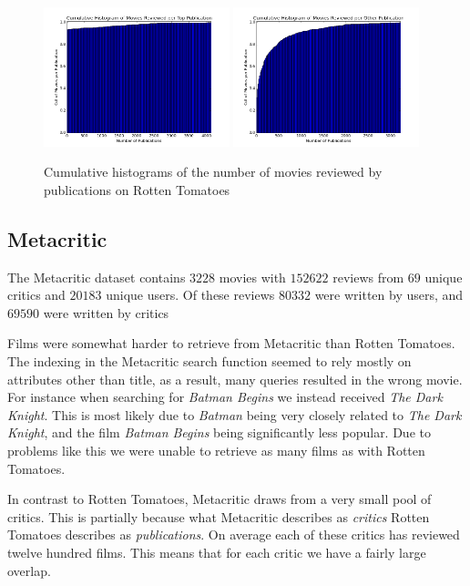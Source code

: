 \documentclass[12pt]{article}
\begin{document}
	 \begin{figure}[H]
	    \centering
	    \includegraphics[width=0.48\textwidth]{plots/plot_r_pub_top.png}
	    \includegraphics[width=0.48\textwidth]{plots/plot_r_pub_oth.png}
	    \caption{Cumulative histograms of the number of movies reviewed by publications on Rotten Tomatoes}
	    \label{fig:r_pub}
	\end{figure}

\subsection{Metacritic}

	The Metacritic dataset contains $3228$ movies with $152622$ reviews from $69$ unique critics and $20183$ unique users. Of these reviews $80332$ were written by users, and $69590$ were written by critics


	Films were somewhat harder to retrieve from Metacritic than Rotten Tomatoes. The indexing in the Metacritic search function seemed to rely mostly on attributes other than title, as a result, many queries resulted in the wrong movie. For instance when searching for \textit{Batman Begins} we instead received \textit{The Dark Knight}. This is most likely due to \textit{Batman} being very closely related to \textit{The Dark Knight}, and the film \textit{Batman Begins} being significantly less popular. Due to problems like this we were unable to retrieve as many films as with Rotten Tomatoes.

	In contrast to Rotten Tomatoes, Metacritic draws from a very small pool of critics. This is partially because what Metacritic describes as \textit{critics} Rotten Tomatoes describes as \textit{publications}. On average each of these critics has reviewed twelve hundred films. This means that for each critic we have a fairly large overlap.
\end{document}
